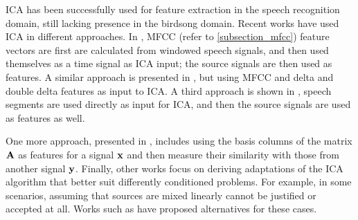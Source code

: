 \documentclass[../main.tex]{subfiles}
\begin{document}
\par ICA has been successfully used for feature extraction in the speech recognition domain, still lacking presence in the birdsong domain. Recent works have used ICA in different approaches. In \cite{Kasprzak}, MFCC (refer to \ref{subsection_mfcc}) feature vectors are first are calculated from windowed speech signals, and then used themselves as a time signal as ICA input; the source signals are then used as features. A similar approach is presented in \cite{Hsieh2009}, but using MFCC and delta and double delta features as input to ICA. A third approach is shown in \cite{Lee2000}, speech segments are used directly as input for ICA, and then the source signals are used as features as well.
\par One more approach, presented in \cite{Jang2001}, includes using the basis columns of the matrix $\mathbf{A}$ as features for a signal $\mathbf{x}$ and then measure their similarity with those from another signal $\mathbf{y}$. Finally, other works focus on deriving adaptations of the ICA algorithm that better suit differently conditioned problems. For example, in some scenarios, assuming that sources are mixed linearly cannot be justified or accepted at all. Works such as \cite{Almeida2003, Omar} have proposed alternatives for these cases.
\end{document}
